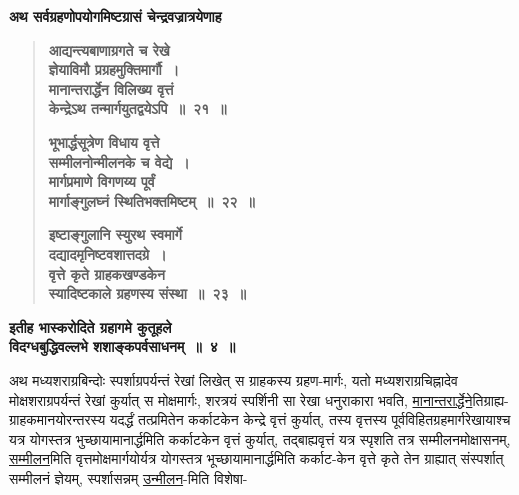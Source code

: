 \documentclass[11pt, openany]{book}
\begin{document}
{\small \textbf{अथ सर्वग्रहणोपयोगमिष्टग्रासं चेन्द्रवज्रात्रयेणाह\textendash }}

\newpage

 \label{4.21}
\begin{quote}
{\large \textbf{{\color{purple}आद्यन्त्यबाणाग्रगते च रेखे \\
ज्ञेयाविमौ प्रग्रहमुक्तिमार्गौ~। \\
मानान्तरार्द्धेन विलिख्य वृत्तं \\
केन्द्रेऽथ तन्मार्गयुतद्वयेऽपि~॥~२१~॥}}
\vspace{1mm}

 \label{4.22}
\textbf{{\color{purple}भूभार्द्धसूत्रेण विधाय वृत्ते \\
सम्मीलनोन्मीलनके च वेद्ये~। \\
मार्गप्रमाणे विगणय्य पूर्वं \\
मार्गाङ्गुलघ्नं स्थितिभक्तमिष्टम्~॥~२२~॥}}
\vspace{1mm}

 \label{4.23}
\textbf{{\color{purple}इष्टाङ्गुलानि स्युरथ स्वमार्गे \\
दद्यादमृनिष्टवशात्तदग्रे~।\\
वृत्ते कृते ग्राहकखण्डकेन \\
स्यादिष्टकाले ग्रहणस्य संस्था~॥~२३~॥}}}
\end{quote}

\begin{center}
{\large \textbf{इतीह भास्करोदिते ग्रहागमे कुतूहले \\
विदग्धबुद्धिवल्लभे शशाङ्कपर्वसाधनम्~॥~४~॥}}
\end{center}

अथ मध्यशराग्रबिन्दोः स्पर्शाग्रपर्यन्तं रेखां लिखेत् स ग्राहकस्य ग्रहण-मार्गः, यतो मध्यशराग्रचिह्नादेव मोक्षशराग्रपर्यन्तं रेखां कुर्यात् स मोक्षमार्गः, शरत्रयं \;स्पर्शिनी \;सा \;रेखा \;धनुराकारा \;भवति, \;\hyperref[4.21]{मानान्तरार्द्धेने}ति\textendash \;ग्राह्य-ग्राहकमानयोरन्तरस्य यदर्द्धं तत्प्रमितेन कर्काटकेन केन्द्रे वृत्तं कुर्यात्, तस्य \;वृत्तस्य \;पूर्वविहितग्रहमार्गरेखायाश्च \;यत्र \;योगस्तत्र \;भुच्छायामानार्द्धमिति कर्काटकेन वृत्तं कुर्यात्, तद्बाह्यवृत्तं यत्र स्पृशति तत्र सम्मीलनमोक्षासनम्, \hyperref[4.22]{सम्मीलन}मिति वृत्तमोक्षमार्गयोर्यत्र योगस्तत्र भूच्छायामानार्द्धमिति कर्काट-केन वृत्ते कृते तेन ग्राह्यात् संस्पर्शात् सम्मीलनं ज्ञेयम्, स्पर्शासन्नम् \hyperref[4.22]{उन्मीलन}-मिति विशेषा-

\newpage
\end{document}
